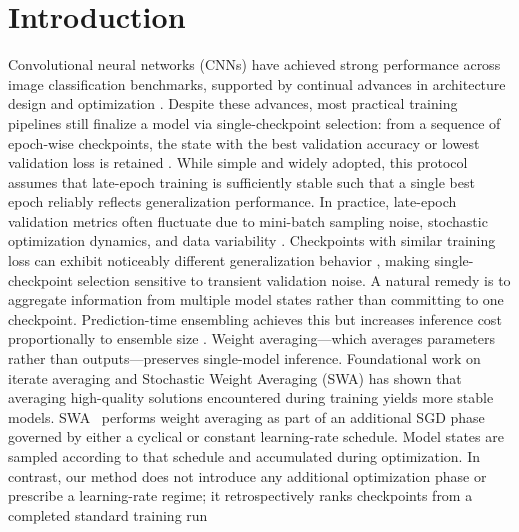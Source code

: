 \documentclass[runningheads]{llncs}
\begin{document}
\section{Introduction}
Convolutional neural networks (CNNs) have achieved strong performance across image classification benchmarks, supported by continual advances in architecture design and optimization \cite{krizhevsky2012imagenet,simonyan2015vgg,he2016deep}. Despite these advances, most practical training pipelines still finalize a model via single-checkpoint selection: from a sequence of epoch-wise checkpoints, the state with the best validation accuracy or lowest validation loss is retained \cite{bishop2006pattern,prechelt2002early}. While simple and widely adopted, this protocol assumes that late-epoch training is sufficiently stable such that a single best epoch reliably reflects generalization performance.
In practice, late-epoch validation metrics often fluctuate due to mini-batch sampling noise, stochastic optimization dynamics, and data variability \cite{prechelt2002early,izmailov2019averagingweightsleadswider,garipov2018losssurfacesmodeconnectivity}. Checkpoints with similar training loss can exhibit noticeably different generalization behavior \cite{keskar2017largebatchtrainingdeeplearning}, making single-checkpoint selection sensitive to transient validation noise. A natural remedy is to aggregate information from multiple model states rather than committing to one checkpoint.
Prediction-time ensembling achieves this but increases inference cost proportionally to ensemble size \cite{dietterich2000ensemble}. Weight averaging—which averages parameters rather than outputs—preserves single-model inference. Foundational work on iterate averaging \cite{polyak1992acceleration} and Stochastic Weight Averaging (SWA) \cite{izmailov2019averagingweightsleadswider} has shown that averaging high-quality solutions encountered during training yields more stable models.
SWA~\cite{izmailov2019averagingweightsleadswider} performs weight
averaging as part of an additional SGD phase governed by either a cyclical or
constant learning-rate schedule. Model states are sampled according to that
schedule and accumulated during optimization. In contrast, our method does not
introduce any additional optimization phase or prescribe a learning-rate regime;
it retrospectively ranks checkpoints from a completed standard training run
\end{document}
